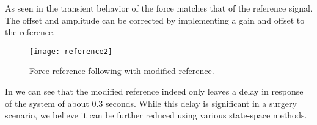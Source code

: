 As seen in  the transient behavior of the force matches that of the reference signal.
The offset and amplitude can be corrected by implementing a gain and offset to the reference.

\begin{figure}[H]
\centering
\hspace{-2.5em}\texttt{[image: reference2]}
\caption{Force reference following with modified reference.}
\label{fig:freffl2}
\end{figure}

In  we can see that the modified reference indeed only leaves a delay in response of the system of about 0.3 seconds.
While this delay is significant in a surgery scenario, we believe it can be further reduced using various state-space methods.